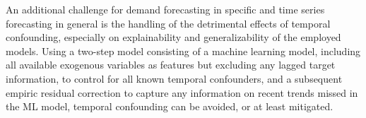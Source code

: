 \documentclass[BCOR=1mm, DIV=calc,10pt,
twoside=true,
twocolumn,
headings=normal]{scrartcl}
\begin{document}
An additional challenge for demand forecasting in specific and time series forecasting in general is the handling of the detrimental effects of temporal confounding, especially on explainability and generalizability of the employed models. Using a two-step model consisting of a machine learning model, including all available exogenous variables as features but excluding any lagged target information, to control for all known temporal confounders, and a subsequent empiric residual correction to capture any information on recent trends missed in the ML model, temporal confounding can be avoided, or at least mitigated.


%
%
%
%
%
%
%
%
%
%
%
\end{document}
